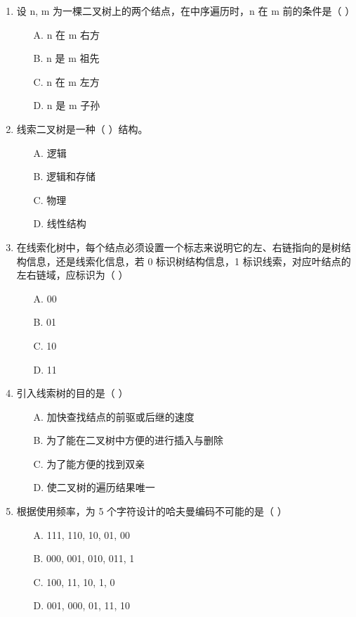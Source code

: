 \documentclass[12pt, a4paper]{article}
\begin{document}
\begin{enumerate}[label=\arabic*.]
	\item 设 n, m 为一棵二叉树上的两个结点，在中序遍历时，n 在 m 前的条件是（ ）
	      \begin{enumerate}
		      \item[A.] n 在 m 右方
		      \item[B.] n 是 m 祖先
		      \item[C.] n 在 m 左方
		      \item[D.] n 是 m 子孙
	      \end{enumerate}

	\item 线索二叉树是一种（ ）结构。
	      \begin{enumerate}
		      \item[A.] 逻辑
		      \item[B.] 逻辑和存储
		      \item[C.] 物理
		      \item[D.] 线性结构
	      \end{enumerate}

	\item 在线索化树中，每个结点必须设置一个标志来说明它的左、右链指向的是树结构信息，还是线索化信息，若 0 标识树结构信息，1 标识线索，对应叶结点的左右链域，应标识为（ ）
	      \begin{enumerate}
		      \item[A.] 00
		      \item[B.] 01
		      \item[C.] 10
		      \item[D.] 11
	      \end{enumerate}

	\item 引入线索树的目的是（ ）
	      \begin{enumerate}
		      \item[A.] 加快查找结点的前驱或后继的速度
		      \item[B.] 为了能在二叉树中方便的进行插入与删除
		      \item[C.] 为了能方便的找到双亲
		      \item[D.] 使二叉树的遍历结果唯一
	      \end{enumerate}

	\item 根据使用频率，为 5 个字符设计的哈夫曼编码不可能的是（ ）
	      \begin{enumerate}
		      \item[A.] 111, 110, 10, 01, 00
		      \item[B.] 000, 001, 010, 011, 1
		      \item[C.] 100, 11, 10, 1, 0
		      \item[D.] 001, 000, 01, 11, 10
	      \end{enumerate}


\end{enumerate}
\end{document}
